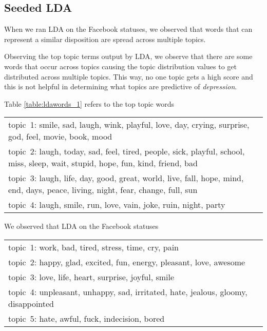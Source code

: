 \subsection{Seeded LDA}
\label{sec:seededlda}
When we ran LDA on the Facebook statuses, we observed that words that can represent a similar disposition are spread across multiple topics.

Observing the top topic terms output by LDA, we observe that there are some words that occur across topics causing the topic distribution values to get distributed across multiple topics. This way, no one topic gets a high score and this is not helpful in determining what topics are predictive of \textit{depression}. 

Table \ref{table:ldawords_1} refers to the top topic words 

\begin{table*} [ht!]
	\begin{tabular}{ l }
\hline
{topic~1: smile, sad, laugh, wink, playful, love, day, crying, surprise, god, feel, movie, book, mood}\\
{topic~2: laugh, today, sad, feel, tired, people, sick, playful, school, miss, sleep, wait, stupid, hope, fun, kind, friend, bad}\\
{topic~3: laugh, life, day, good, great, world, live, fall, hope, mind, end, days, peace, living, night, fear, change, full, sun}\\
{topic~4: laugh, smile, run, love, vain, joke, ruin, night, party}\\
\hline
    \end{tabular}
      \caption{\noindent Seed words for \textit{SeededLDA}}
        \label{table:ldawords_1}
\end{table*}

We observed that LDA on the Facebook statuses
\begin{table*} [ht!]
	\begin{tabular}{ l }
{topic~1: work, bad, tired, stress, time, cry, pain}\\
{topic~2: happy, glad, excited, fun, energy, pleasant, love, awesome}\\
{topic~3: love, life, heart, surprise, joyful, smile}\\
{topic~4: unpleasant, unhappy, sad, irritated, hate, jealous, gloomy, disappointed }\\
{topic~5: hate, awful, fuck, indecision, bored}\\
    \end{tabular}
      \caption{\noindent Seed words for \textit{SeededLDA}}
        \label{table:seedwords_1}
\end{table*}


